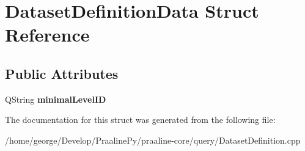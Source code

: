 \hypertarget{struct_dataset_definition_data}{}\section{Dataset\+Definition\+Data Struct Reference}
\label{struct_dataset_definition_data}
\subsection*{Public Attributes}
\begin{DoxyCompactItemize}
\item 
\mbox{\label{struct_dataset_definition_data_ae02b36d39d6a7a33f9059613000f473d}} 
Q\+String {\bfseries minimal\+Level\+ID}
\end{DoxyCompactItemize}


The documentation for this struct was generated from the following file\+:\begin{DoxyCompactItemize}
\item 
/home/george/\+Develop/\+Praaline\+Py/praaline-\/core/query/Dataset\+Definition.\+cpp\end{DoxyCompactItemize}
